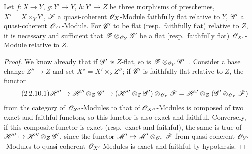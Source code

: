 \begin{proposition}[2.2.10]
\label{IV.2.2.10}
Let $f:X\to Y$, $g:Y'\to Y$, $h:Y'\to Z$ be three morphisms of preschemes, $X'=X\times_Y Y'$, $\mathscr{F}$ a quasi-coherent $\mathscr{O}_X$-Module faithfully flat relative to $Y$, $\mathscr{G}'$ a quasi-coherent $\mathscr{O}_{Y'}$-Module.
For $\mathscr{G}'$ to be flat \textnormal{(}resp.\ faithfully flat\textnormal{)} relative to $Z$, it is necessary and sufficient that $\mathscr{F}\otimes_{\mathscr{O}_Y}\mathscr{G}'$ be a flat \textnormal{(}resp.\ faithfully flat\textnormal{)} $\mathscr{O}_{X'}$-Module relative to $Z$.
\end{proposition}

\begin{proof}
We know already that if $\mathscr{G}'$ is $Z$-flat, so is $\mathscr{F}\otimes_{\mathscr{O}_Y}\mathscr{G}'$~.
Consider a base change $Z''\to Z$ and set $X''=X'\times_Z Z''$; if $\mathscr{G}'$ is faithfully flat relative to $Z$, the functor
\begin{equation}
\tag{2.2.10.1}
\label{IV.2.2.10.1}
\mathscr{H}''\mapsto\mathscr{H}''\otimes_Z\mathscr{G}'\to(\mathscr{H}''\otimes_Z\mathscr{G}')\otimes_{\mathscr{O}_Y}\mathscr{F}=\mathscr{H}''\otimes_Z(\mathscr{G}'\otimes_{\mathscr{O}_Y}\mathscr{F})
\end{equation}
from the category of $\mathscr{O}_{Z''}$-Modules to that of $\mathscr{O}_{X''}$-Modules is composed of two exact and faithful functors, so this functor is also exact and faithful.
Conversely, if this composite functor is exact \textnormal{(}resp.\ exact and faithful\textnormal{)}, the same is true of $\mathscr{H}''\mapsto\mathscr{H}''\otimes_Z\mathscr{G}'$, since the functor $\mathscr{M}'\mapsto\mathscr{M}'\otimes_{\mathscr{O}_Y}\mathscr{F}$ from quasi-coherent $\mathscr{O}_{Y'}$-Modules to quasi-coherent $\mathscr{O}_{X'}$-Modules is exact and faithful by hypothesis.
\end{proof}

